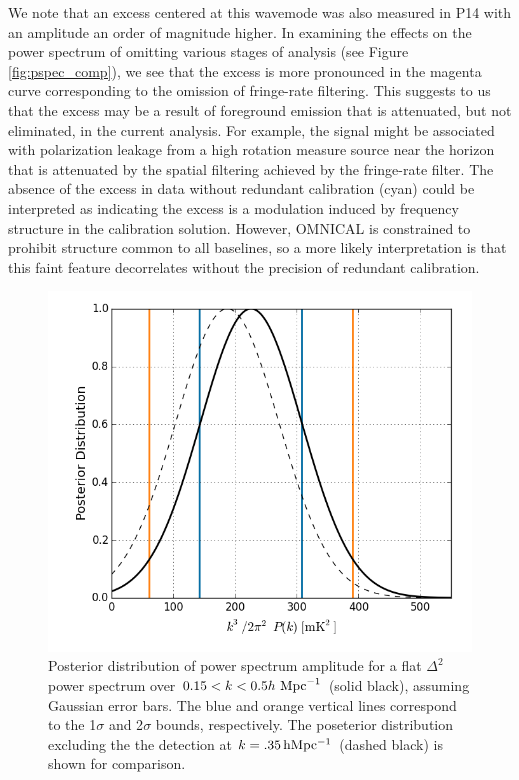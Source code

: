 \documentclass[twocolumn,numberedappendix]{emulateapj} \shorttitle{PSA64}
\newcommand{\hMpci}{h\ {\rm Mpc}^{-1}}
\begin{document}
We note that an excess centered at this wavemode was also
measured in P14 with an amplitude an order of magnitude higher.
In examining the effects on the power
spectrum of omitting various stages of analysis (see Figure \ref{fig:pspec_comp}), we
see that the excess is more pronounced in the magenta curve corresponding 
to the omission of fringe-rate filtering.
This suggests to us that the excess may be a result of foreground emission that is attenuated,
but not eliminated, in the current analysis.  
For example, the signal might be associated with
polarization leakage from a high rotation measure source near the horizon that
is attenuated by the spatial filtering achieved by the fringe-rate filter.
The absence of the excess in data without redundant calibration
(cyan) could be interpreted as indicating the excess is a modulation induced by frequency structure
in the calibration solution.  However, OMNICAL is constrained
to prohibit structure common to all baselines, so a more likely interpretation is that 
this faint feature decorrelates without the precision of redundant calibration.

\begin{figure}\centering
\includegraphics[width=\columnwidth]{plots/flat_k3pk_posterior.png}
\caption{Posterior distribution of power spectrum amplitude for a flat $\Delta^{2}$
power spectrum over $0.15<k<0.5\hMpci$ (solid black),
assuming Gaussian error bars. The blue and orange
vertical lines correspond to the 1$\sigma$ and 2$\sigma$ bounds, respectively.
The poseterior distribution excluding the the detection at $k=.35\rm \,hMpc^{-1}$ (dashed black) is shown for comparison.
}
\label{fig:final_posterior}
\end{figure}
\end{document}
